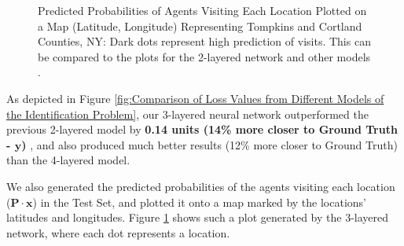 \documentclass[12pt]{article}
\newcommand{\matr}[1]{\mathbf{#1}}  %
\begin{document}
\begin{figure}[!htbp]
\begin{minipage}{.49\textwidth}
            \caption[Predicted Probabilities of Agents Visiting Each Location Plotted on a Map (Latitude, Longitude) Representing Tompkins and Cortland Counties, NY]{Predicted Probabilities of Agents Visiting Each Location Plotted on a Map (Latitude, Longitude) Representing Tompkins and Cortland Counties, NY: Dark dots represent high prediction of visits. This can be compared to the plots for the 2-layered network and other models \cite[Figure 3]{Xue2016Avi2}.}
            \label{fig:Predicted Probabilities of Agents Visiting Each Location Plotted on a Map}
        \end{minipage}
    \end{figure}

    As depicted in Figure \ref{fig:Comparison of Loss Values from Different Models of the Identification Problem}, our 3-layered neural network outperformed the previous 2-layered model by \textbf{0.14 units (14\% more closer to Ground Truth - $\matr{y}$)} \cite[Table 1]{Xue2016Avi2}, and also produced much better results (12\% more closer to Ground Truth) than the 4-layered model.
    
    We also generated the predicted probabilities of the agents visiting each location ($\matr{P} \cdot \matr{x}$) in the Test Set, and plotted it onto a map marked by the locations' latitudes and longitudes. Figure \ref{fig:Predicted Probabilities of Agents Visiting Each Location Plotted on a Map} shows such a plot generated by the 3-layered network, where each dot represents a location.
    
\end{document}
